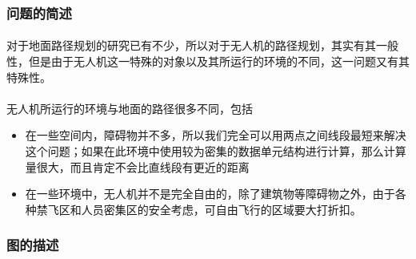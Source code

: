 \documentclass[UTF8,a4paper]{ctexart}
\begin{document}
\subsubsection{问题的简述}
\paragraph{}对于地面路径规划的研究已有不少，所以对于无人机的路径规划，其实有其一般性，但是由于无人机这一特殊的对象以及其所运行的环境的不同，这一问题又有其特殊性。
\paragraph{}无人机所运行的环境与地面的路径很多不同，包括\begin{itemize}
    \item 在一些空间内，障碍物并不多，所以我们完全可以用两点之间线段最短来解决这个问题；如果在此环境中使用较为密集的数据单元结构进行计算，那么计算量很大，而且肯定不会比直线段有更近的距离
    \item 在一些环境中，无人机并不是完全自由的，除了建筑物等障碍物之外，由于各种禁飞区和人员密集区的安全考虑，可自由飞行的区域要大打折扣。
\end{itemize}
\subsubsection{图的描述}
\end{document}
